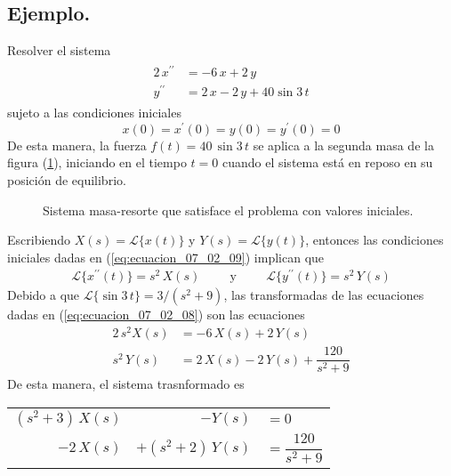 \subsection*{Ejemplo.}
Resolver el sistema
\begin{align}
\begin{aligned}
2 \, x^{\prime \prime} &=  - 6 \, x + 2 \, y \\
y^{\prime \prime} &= 2 \, x - 2 \, y + 40 \sin 3 \, t
\end{aligned}
\label{eq:ecuacion_07_02_08}
\end{align}
sujeto a las condiciones iniciales
\begin{equation}
x(0) = x^{\prime} (0) = y(0) = y^{\prime} (0) = 0
\label{eq:ecuacion_07_02_09}
\end{equation}
De esta manera, la fuerza $f(t) = 40 \, \sin 3 \, t$ se aplica a la segunda masa de la figura (\ref{fig:figura_07_02_05}), iniciando en el tiempo $t=0$ cuando el sistema está en reposo en su posición de equilibrio.
\begin{figure}[!ht]
    \centering
    
    \caption{Sistema masa-resorte que satisface el problema con valores iniciales.}
    \label{fig:figura_07_02_05}
\end{figure}
Escribiendo $X(s) = \mathscr{L} \{ x(t) \} $ y $Y(s) = \mathscr{L} \{ y(t) \} $, entonces las condiciones iniciales dadas en (\ref{eq:ecuacion_07_02_09}) implican que
\begin{align*}
\mathscr{L} \{ x^{\prime \prime} (t) \} = s^{2} \, X(s) \hspace{1cm} \mbox{y} \hspace{1cm} \mathscr{L} \{ y^{\prime \prime}(t) \} = s^{2} \, Y(s)
\end{align*}
Debido a que $\mathscr{L} \{ \sin 3 \, t \} = 3 / (s^{2} + 9)$, las transformadas de las ecuaciones dadas en (\ref{eq:ecuacion_07_02_08}) son las ecuaciones
\begin{align*}
2 \, s^{2} X(s) &= - 6 \, X(s) + 2 \, Y(s) \\
s^{2} \, Y(s) &= 2 \, X(s) - 2 \, Y(s) + \dfrac{120}{s^{2} + 9}
\end{align*}
De esta manera, el sistema trasnformado es
\par
\begin{center}
\begin{tabular}{r r l}
$(s^{2} + 3) \, X(s)$ & $-Y(s)$ & $=0$ \\
$-2 \, X(s)$ & $+(s^{2} + 2) \, Y(s)$ & $=\dfrac{120}{s^{2}+9}$ 
\end{tabular}
\end{center}
